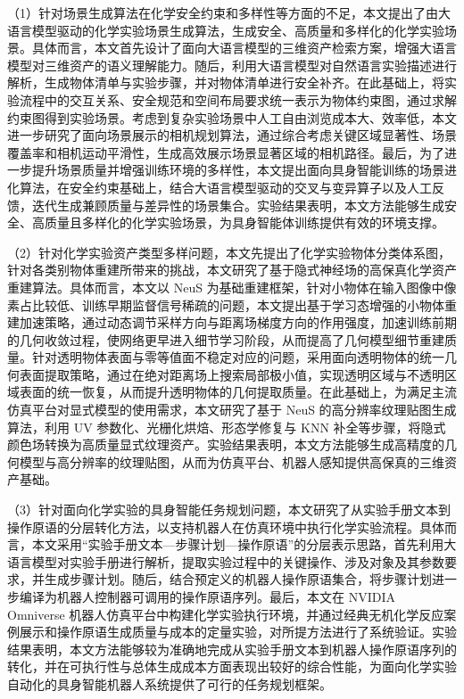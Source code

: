 （1）针对场景生成算法在化学安全约束和多样性等方面的不足，本文提出了由大语言模型驱动的化学实验场景生成算法，生成安全、高质量和多样化的化学实验场景。具体而言，本文首先设计了面向大语言模型的三维资产检索方案，增强大语言模型对三维资产的语义理解能力。随后，利用大语言模型对自然语言实验描述进行解析，生成物体清单与实验步骤，并对物体清单进行安全补齐。在此基础上，将实验流程中的交互关系、安全规范和空间布局要求统一表示为物体约束图，通过求解约束图得到实验场景。考虑到复杂实验场景中人工自由浏览成本大、效率低，本文进一步研究了面向场景展示的相机规划算法，通过综合考虑关键区域显著性、场景覆盖率和相机运动平滑性，生成高效展示场景显著区域的相机路径。最后，为了进一步提升场景质量并增强训练环境的多样性，本文提出面向具身智能训练的场景进化算法，在安全约束基础上，结合大语言模型驱动的交叉与变异算子以及人工反馈，迭代生成兼顾质量与差异性的场景集合。实验结果表明，本文方法能够生成安全、高质量且多样化的化学实验场景，为具身智能体训练提供有效的环境支撑。

（2）针对化学实验资产类型多样问题，本文先提出了化学实验物体分类体系图，针对各类别物体重建所带来的挑战，本文研究了基于隐式神经场的高保真化学资产重建算法。具体而言，本文以 NeuS 为基础重建框架，针对小物体在输入图像中像素占比较低、训练早期监督信号稀疏的问题，本文提出基于学习态增强的小物体重建加速策略，通过动态调节采样方向与距离场梯度方向的作用强度，加速训练前期的几何收敛过程，使网络更早进入细节学习阶段，从而提高了几何模型细节重建质量。针对透明物体表面与零等值面不稳定对应的问题，采用面向透明物体的统一几何表面提取策略，通过在绝对距离场上搜索局部极小值，实现透明区域与不透明区域表面的统一恢复，从而提升透明物体的几何提取质量。在此基础上，为满足主流仿真平台对显式模型的使用需求，本文研究了基于 NeuS 的高分辨率纹理贴图生成算法，利用 UV 参数化、光栅化烘焙、形态学修复与 KNN 补全等步骤，将隐式颜色场转换为高质量显式纹理资产。实验结果表明，本文方法能够生成高精度的几何模型与高分辨率的纹理贴图，从而为仿真平台、机器人感知提供高保真的三维资产基础。

（3）针对面向化学实验的具身智能任务规划问题，本文研究了从实验手册文本到操作原语的分层转化方法，以支持机器人在仿真环境中执行化学实验流程。具体而言，本文采用“实验手册文本—步骤计划—操作原语”的分层表示思路，首先利用大语言模型对实验手册进行解析，提取实验过程中的关键操作、涉及对象及其参数要求，并生成步骤计划。随后，结合预定义的机器人操作原语集合，将步骤计划进一步编译为机器人控制器可调用的操作原语序列。最后，本文在 NVIDIA Omniverse 机器人仿真平台中构建化学实验执行环境，并通过经典无机化学反应案例展示和操作原语生成质量与成本的定量实验，对所提方法进行了系统验证。实验结果表明，本文方法能够较为准确地完成从实验手册文本到机器人操作原语序列的转化，并在可执行性与总体生成成本方面表现出较好的综合性能，为面向化学实验自动化的具身智能机器人系统提供了可行的任务规划框架。


